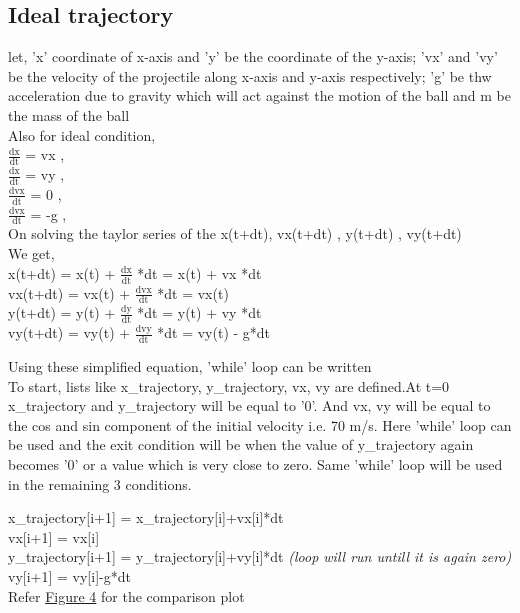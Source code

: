 \documentclass[11pt]{article}
\begin{document}
\subsection{Ideal trajectory}
\begin{raggedright}
let, 'x' coordinate of x-axis and 'y' be the coordinate of the y-axis; 'vx' and 'vy' be the velocity of the projectile along x-axis and y-axis respectively; 'g' be thw acceleration due to gravity which will act against the motion of the ball and m be the mass of the ball\\
Also for ideal condition,\\
$\frac{\text{dx}}{\text{dt}}$ = vx , \\
$\frac{\text{dx}}{\text{dt}}$ = vy , \\
$\frac{\text{dvx}}{\text{dt}}$ = 0 , \\
$\frac{\text{dvx}}{\text{dt}}$ = -g , \\
On solving the taylor series of the x(t+dt), vx(t+dt) , y(t+dt) , vy(t+dt)\\
We get,\\
x(t+dt) = x(t) + $\frac{\text{dx}}{\text{dt}}$ *dt = x(t) + vx *dt\\
vx(t+dt) = vx(t) + $\frac{\text{dvx}}{\text{dt}}$ *dt = vx(t)\\
y(t+dt) = y(t) + $\frac{\text{dy}}{\text{dt}}$ *dt = y(t) + vy *dt\\
vy(t+dt) = vy(t) + $\frac{\text{dvy}}{\text{dt}}$ *dt = vy(t) - g*dt\\

\end{raggedright}

\begin{raggedright}
\begin{justify}
Using these simplified equation, 'while' loop can be written\\
To start, lists like x\_trajectory, y\_trajectory, vx, vy are defined.At t=0 x\_trajectory and y\_trajectory will be equal to '0'. And vx, vy will be equal to the cos and sin component of the initial velocity i.e. 70 m/s. Here 'while' loop can be used and the exit condition will be when the value of y\_trajectory again becomes '0' or a value which is very close to zero. Same 'while' loop will be used in the remaining 3 conditions.
\end{justify}
\end{raggedright}

\begin{raggedright}
\begin{justify}
x\_trajectory[i+1] = x\_trajectory[i]+vx[i]*dt\\
vx[i+1] = vx[i]\\
y\_trajectory[i+1] = y\_trajectory[i]+vy[i]*dt \textit{(loop will run untill it is again zero)}\\
vy[i+1] = vy[i]-g*dt\\
Refer \hyperref[fig:ideal_trajectory]{Figure 4} for the comparison plot

\end{justify}
\end{raggedright}
\end{document}
